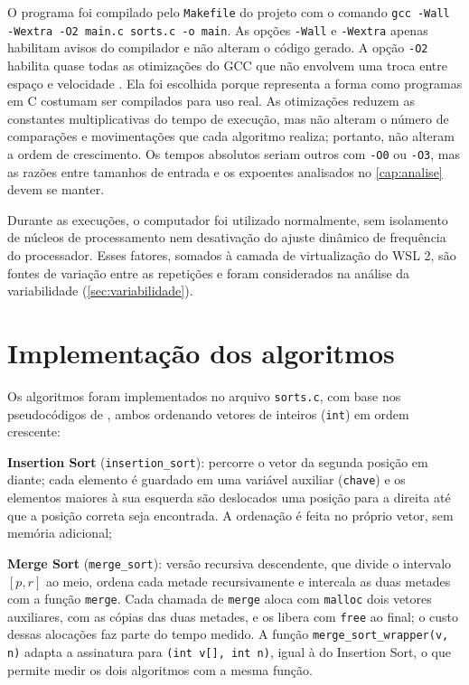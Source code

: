 \documentclass[
    12pt,
    oneside,
    a4paper,
    openany,
    chapter=TITLE,
    english,
    brazil
]{abntex2}
\begin{document}
O programa foi compilado pelo \texttt{Makefile} do projeto com o comando \texttt{gcc -Wall -Wextra -O2 main.c sorts.c -o main}. As opções \texttt{-Wall} e \texttt{-Wextra} apenas habilitam avisos do compilador e não alteram o código gerado. A opção \texttt{-O2} habilita quase todas as otimizações do GCC que não envolvem uma troca entre espaço e velocidade \cite{gcc2025}. Ela foi escolhida porque representa a forma como programas em C costumam ser compilados para uso real. As otimizações reduzem as constantes multiplicativas do tempo de execução, mas não alteram o número de comparações e movimentações que cada algoritmo realiza; portanto, não alteram a ordem de crescimento. Os tempos absolutos seriam outros com \texttt{-O0} ou \texttt{-O3}, mas as razões entre tamanhos de entrada e os expoentes analisados no \autoref{cap:analise} devem se manter.

Durante as execuções, o computador foi utilizado normalmente, sem isolamento de núcleos de processamento nem desativação do ajuste dinâmico de frequência do processador. Esses fatores, somados à camada de virtualização do WSL 2, são fontes de variação entre as repetições e foram considerados na análise da variabilidade (\autoref{sec:variabilidade}).

\section{Implementação dos algoritmos}

Os algoritmos foram implementados no arquivo \texttt{sorts.c}, com base nos pseudocódigos de , ambos ordenando vetores de inteiros (\texttt{int}) em ordem crescente:

\begin{alineas}
    \item \textbf{Insertion Sort} (\texttt{insertion\_sort}): percorre o vetor da segunda posição em diante; cada elemento é guardado em uma variável auxiliar (\texttt{chave}) e os elementos maiores à sua esquerda são deslocados uma posição para a direita até que a posição correta seja encontrada. A ordenação é feita no próprio vetor, sem memória adicional;
    \item \textbf{Merge Sort} (\texttt{merge\_sort}): versão recursiva descendente, que divide o intervalo $[p, r]$ ao meio, ordena cada metade recursivamente e intercala as duas metades com a função \texttt{merge}. Cada chamada de \texttt{merge} aloca com \texttt{malloc} dois vetores auxiliares, com as cópias das duas metades, e os libera com \texttt{free} ao final; o custo dessas alocações faz parte do tempo medido. A função \texttt{merge\_sort\_wrapper(v, n)} adapta a assinatura para \texttt{(int v[], int n)}, igual à do Insertion Sort, o que permite medir os dois algoritmos com a mesma função.
\end{alineas}
\end{document}
